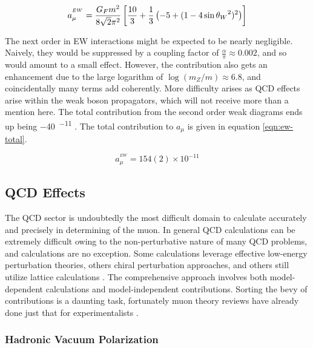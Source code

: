 \begin{equation}
\label{eqn:weak-lowest-order}
a_\mu^{^{EW}} = \frac{G_F m^2}{8\sqrt{2}\pi^2} \\
\left[\frac{10}{3} + \frac{1}{3} \left(-5 + (1 - 4\sin{\theta_W}^2)^2 \right) \right]
\end{equation}

The next order in EW interactions might be expected to be nearly negligible.  Naively, they would be suppressed by a coupling factor of $\frac{\alpha}{\pi} \approx 0.002$, and so would amount to a small effect.  However, the contribution also gets an enhancement due to the large logarithm of $\log(m_Z/m) \approx 6.8$, and coincidentally many terms add coherently.  More difficulty arises as QCD effects arise within the weak boson propagators, which will not receive more than a mention here.  The total contribution from the second order weak diagrams ends up being \SI{-40}{^{-11}} \cite{the-muon-g-2}.  The total contribution to $a_\mu$ is given in equation \ref{eqn:ew-total}. 

\begin{equation}
\label{eqn:ew-total}
a_\mu^{^{EW}} = 154(2) \times 10^{-11}
\end{equation}

\subsection{QCD Effects} \label{s-sec:theory-qcd}

The QCD sector is undoubtedly the most difficult domain to calculate accurately and precisely in determining \gmtwo of the muon.  In general QCD calculations can be extremely difficult owing to the non-perturbative nature of many QCD problems, and \mugmtwo calculations are no exception.  Some calculations leverage effective low-energy perturbation theories, others chiral perturbation approaches, and others still utilize lattice calculations \cite{the-muon-g-2}.  The comprehensive approach involves both model-dependent calculations and model-independent contributions.  Sorting the bevy of contributions is a daunting task, fortunately muon \gmtwo theory reviews have already done just that for experimentalists \cite{the-muon-g-2, a-mu-harbinger, muon-g-2-blum, muon-g-2-hadronic-jegerlehner}.

\subsubsection{Hadronic Vacuum Polarization}

